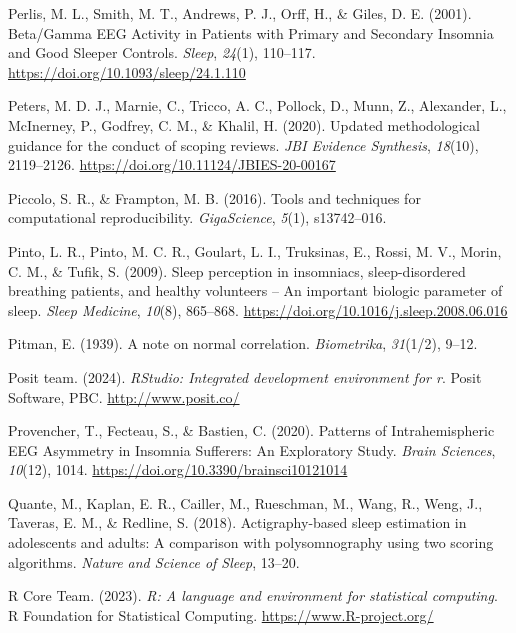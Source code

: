 \documentclass[
]{article}
\newlength{\cslhangindent}
\newenvironment{CSLReferences}[2] %
 {\begin{list}{}{%
  \setlength{\itemindent}{0pt}
  \setlength{\leftmargin}{0pt}
  \setlength{\parsep}{0pt}
  \ifodd #1
   \setlength{\leftmargin}{\cslhangindent}
   \setlength{\itemindent}{-1\cslhangindent}
  \fi
  \setlength{\itemsep}{#2\baselineskip}}}
 {\end{list}}
\begin{document}
\begin{CSLReferences}{1}{0}
Perlis, M. L., Smith, M. T., Andrews, P. J., Orff, H., \& Giles, D. E. (2001). Beta/{Gamma} {EEG} {Activity} in {Patients} with {Primary} and {Secondary} {Insomnia} and {Good} {Sleeper} {Controls}. \emph{Sleep}, \emph{24}(1), 110--117. \url{https://doi.org/10.1093/sleep/24.1.110}

Peters, M. D. J., Marnie, C., Tricco, A. C., Pollock, D., Munn, Z., Alexander, L., McInerney, P., Godfrey, C. M., \& Khalil, H. (2020). {Updated methodological guidance for the conduct of scoping reviews}. \emph{JBI Evidence Synthesis}, \emph{18}(10), 2119--2126. \url{https://doi.org/10.11124/JBIES-20-00167}

Piccolo, S. R., \& Frampton, M. B. (2016). Tools and techniques for computational reproducibility. \emph{GigaScience}, \emph{5}(1), s13742--016.

Pinto, L. R., Pinto, M. C. R., Goulart, L. I., Truksinas, E., Rossi, M. V., Morin, C. M., \& Tufik, S. (2009). Sleep perception in insomniacs, sleep-disordered breathing patients, and healthy volunteers -- {An} important biologic parameter of sleep. \emph{Sleep Medicine}, \emph{10}(8), 865--868. \url{https://doi.org/10.1016/j.sleep.2008.06.016}

Pitman, E. (1939). A note on normal correlation. \emph{Biometrika}, \emph{31}(1/2), 9--12.

Posit team. (2024). \emph{RStudio: Integrated development environment for r}. Posit Software, PBC. \url{http://www.posit.co/}

Provencher, T., Fecteau, S., \& Bastien, C. (2020). Patterns of {Intrahemispheric} {EEG} {Asymmetry} in {Insomnia} {Sufferers}: {An} {Exploratory} {Study}. \emph{Brain Sciences}, \emph{10}(12), 1014. \url{https://doi.org/10.3390/brainsci10121014}

Quante, M., Kaplan, E. R., Cailler, M., Rueschman, M., Wang, R., Weng, J., Taveras, E. M., \& Redline, S. (2018). Actigraphy-based sleep estimation in adolescents and adults: A comparison with polysomnography using two scoring algorithms. \emph{Nature and Science of Sleep}, 13--20.

R Core Team. (2023). \emph{R: A language and environment for statistical computing}. R Foundation for Statistical Computing. \url{https://www.R-project.org/}


\end{CSLReferences}
\end{document}
